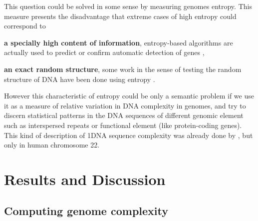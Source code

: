 \cite{Gregory2005}

This question could be solved in some sense by measuring genomes entropy. This measure presents the disadvantage that extreme cases of high entropy could correspond to \begin{inparaenum} \item {\bf a specially high content of information}, entropy-based algorithms are actually used to predict or confirm automatic detection of genes \cite{Du2006,Gerstein2007}, \item {\bf an exact random structure}, some work in the sense of testing the random structure of DNA have been done using entropy \cite{Loewenstern1999}. \end{inparaenum} However this characteristic of entropy could be only a semantic problem if we use it as a measure of relative variation in DNA complexity in genomes, and try to discern statistical patterns in the DNA sequences of different genomic element such as interspersed repeats or functional element (like protein-coding genes). This kind of description of 1DNA sequence complexity was already done by \cite{Holste2001}, but only in human chromosome 22.

\section{Results and Discussion}
\label{sec:dna_struct-result}

\subsection{Computing genome complexity}
\label{sec:comp-genome-compl}


